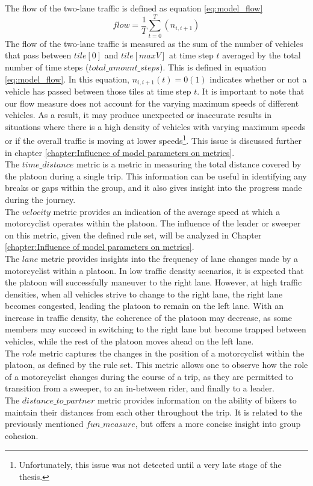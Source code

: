The flow of the two-lane traffic is defined as equation \ref{eq:model_flow}
\begin{equation}
    flow = \frac{1}{T}\sum_{t={0}}^{T}(n_{i, i+1})
    \label{eq:model_flow}
\end{equation}
The flow of the two-lane traffic is measured as the sum of the number of vehicles that pass between $tile[0]$  and $tile[maxV]$ at time step $t$ averaged by the total number of time steps ($total\_amount\_steps$). This is defined in equation \ref{eq:model_flow}. In this equation, $n_{i, i+1}(t) = 0(1)$ indicates whether or not a vehicle has passed between those tiles at time step $t$. It is important to note that our flow measure does not account for the varying maximum speeds of different vehicles. As a result, it may produce unexpected or inaccurate results in situations where there is a high density of vehicles with varying maximum speeds or if the overall traffic is moving at lower speeds\footnote{Unfortunately, this issue was not detected until a very late stage of the thesis.}. This issue is discussed further in chapter \ref{chapter:Influence of model parameters on metrics}.\\
The $time\_distance$ metric is a metric in measuring the total distance covered by the platoon during a single trip. This information can be useful in identifying any breaks or gaps within the group, and it also gives insight into the progress made during the journey.\\
The $velocity$ metric provides an indication of the average speed at which a motorcyclist operates within the platoon. The influence of the leader or sweeper on this metric, given the defined rule set, will be analyzed in Chapter \ref{chapter:Influence of model parameters on metrics}.\\
The $lane$ metric provides insights into the frequency of lane changes made by a motorcyclist within a platoon. In low traffic density scenarios, it is expected that the platoon will successfully maneuver to the right lane. However, at high traffic densities, when all vehicles strive to change to the right lane, the right lane becomes congested, leading the platoon to remain on the left lane. With an increase in traffic density, the coherence of the platoon may decrease, as some members may succeed in switching to the right lane but become trapped between vehicles, while the rest of the platoon moves ahead on the left lane.\\
The $role$ metric captures the changes in the position of a motorcyclist within the platoon, as defined by the rule set. This metric allows one to observe how the role of a motorcyclist changes during the course of a trip, as they are permitted to transition from a sweeper, to an in-between rider, and finally to a leader.\\
The $distance\_to\_partner$ metric provides information on the ability of bikers to maintain their distances from each other throughout the trip. It is related to the previously mentioned $fun\_measure$, but offers a more concise insight into group cohesion.


